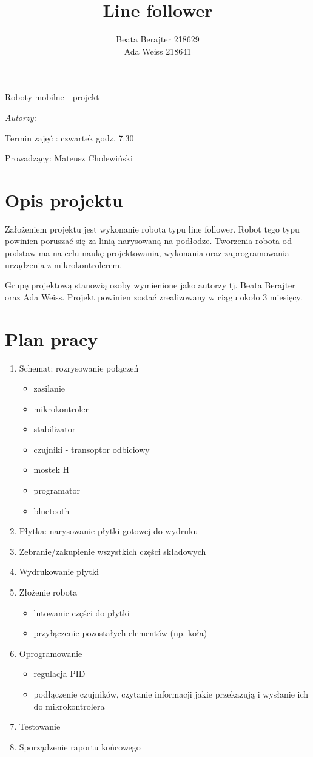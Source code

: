 \documentclass[a4paper,12pt]{article}
\author{Beata Berajter 218629\\
Ada Weiss 218641}%
\title{Line follower}
\makeatletter
\renewcommand{\maketitle}{\begin{titlepage}  
    \vspace*{1cm}
    \begin{center}
  Roboty mobilne - projekt
    \end{center}
      \vspace{3cm}
    \begin{center}
     \LARGE \textsc {\@title}
         \end{center}
     \vspace{1cm}
    
    \begin{center}
    \textit{ Autorzy:}\\
   \textit{\@author} 
     \end{center}
      \vspace{1cm}
     
     \begin{center}
    Termin zajęć :
    czwartek godz. 7:30
    
    Prowadzący:
  Mateusz Cholewiński %
    \end{center}
    
    \vspace*{\stretch{6}}
    \begin{center}
    \@date
    \end{center}
  \end{titlepage}
}
\makeatother
\begin{document}
\newpage
\maketitle
\newpage
\tableofcontents

\newpage
\section{Opis projektu}
Założeniem projektu jest wykonanie robota typu line follower. Robot tego typu powinien poruszać się za linią narysowaną na podłodze.  Tworzenia robota od podstaw ma na celu naukę projektowania, wykonania oraz zaprogramowania urządzenia z mikrokontrolerem.

Grupę projektową stanowią osoby wymienione jako autorzy tj. Beata Berajter oraz Ada Weiss.
Projekt powinien zostać zrealizowany w ciągu około 3 miesięcy.
\section{Plan pracy}
\begin{enumerate}
\item Schemat: rozrysowanie połączeń
	\begin{itemize}
	\item zasilanie
	\item mikrokontroler
	\item stabilizator
	\item czujniki - transoptor odbiciowy %
	\item mostek H
	\item programator
	\item bluetooth
	\end{itemize}
\item Płytka: narysowanie płytki gotowej do wydruku
\item Zebranie/zakupienie wszystkich części składowych
\item Wydrukowanie płytki
\item Złożenie robota
	\begin{itemize}
	\item lutowanie części do płytki
	\item przyłączenie pozostałych elementów (np. koła)
	\end{itemize}
\item Oprogramowanie
	\begin{itemize}
	\item regulacja PID
	\item podłączenie czujników, czytanie informacji jakie przekazują i wysłanie ich do mikrokontrolera
	\end{itemize}
\item Testowanie
\item Sporządzenie raportu  końcowego

\end{enumerate}
\end{document}
